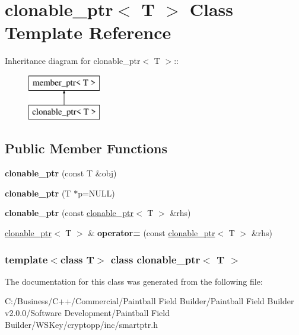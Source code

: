 \hypertarget{classclonable__ptr}{
\section{clonable\_\-ptr$<$ T $>$ Class Template Reference}
\label{classclonable__ptr}
}
Inheritance diagram for clonable\_\-ptr$<$ T $>$::\begin{figure}[H]
\begin{center}
\leavevmode
\includegraphics[height=2cm]{classclonable__ptr}
\end{center}
\end{figure}
\subsection*{Public Member Functions}
\begin{DoxyCompactItemize}
\item 
\hypertarget{classclonable__ptr_a0b979cda52711b98f55519452bd280d5}{
{\bfseries clonable\_\-ptr} (const T \&obj)}
\label{classclonable__ptr_a0b979cda52711b98f55519452bd280d5}

\item 
\hypertarget{classclonable__ptr_ae6e1a740d3fcf79bacf0949951ab44cb}{
{\bfseries clonable\_\-ptr} (T $\ast$p=NULL)}
\label{classclonable__ptr_ae6e1a740d3fcf79bacf0949951ab44cb}

\item 
\hypertarget{classclonable__ptr_a5e0c040b25241109601866a7a25f16bf}{
{\bfseries clonable\_\-ptr} (const \hyperlink{classclonable__ptr}{clonable\_\-ptr}$<$ T $>$ \&rhs)}
\label{classclonable__ptr_a5e0c040b25241109601866a7a25f16bf}

\item 
\hypertarget{classclonable__ptr_ab8bf1ea54e4f115885c465b759d75052}{
\hyperlink{classclonable__ptr}{clonable\_\-ptr}$<$ T $>$ \& {\bfseries operator=} (const \hyperlink{classclonable__ptr}{clonable\_\-ptr}$<$ T $>$ \&rhs)}
\label{classclonable__ptr_ab8bf1ea54e4f115885c465b759d75052}

\end{DoxyCompactItemize}
\subsubsection*{template$<$class T$>$ class clonable\_\-ptr$<$ T $>$}



The documentation for this class was generated from the following file:\begin{DoxyCompactItemize}
\item 
C:/Business/C++/Commercial/Paintball Field Builder/Paintball Field Builder v2.0.0/Software Development/Paintball Field Builder/WSKey/cryptopp/inc/smartptr.h\end{DoxyCompactItemize}
